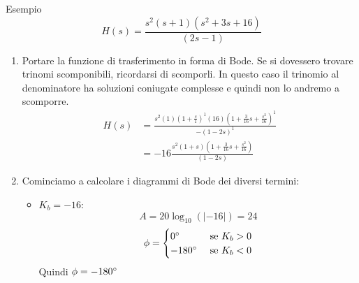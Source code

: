 \documentclass[a4paper]{article}
\begin{document}
\begin{examplebox}{Esempio}
    \[H(s) = \frac{s^2(s+1)(s^2+3s+16)}{(2s-1)}\]
    \begin{enumerate}
        \item Portare la funzione di trasferimento in forma di Bode. Se si dovessero trovare trinomi scomponibili, ricordarsi di scomporli. In questo caso
        il trinomio al denominatore ha soluzioni coniugate complesse e quindi non lo andremo a scomporre.
        \begin{align*}
            H(s) &= \frac{s^2(1)\left(1+\frac{s}{1}\right)^1(16)\left(1 + \frac{3}{16}s + \frac{s^2}{16}\right)^1}{-(1 - 2s)^1}\\
            &= -16 \frac{s^2(1+s)\left(1 +\frac{3}{16}s + \frac{s^2}{16}\right)}{(1-2s)}
        \end{align*}
        \item Cominciamo a calcolare i diagrammi di Bode dei diversi termini:
        \begin{itemize}
            \item $K_b = -16$: 
            \[A = 20\log_{10} (|-16|) = 24\]
            \[\phi = \begin{cases}
                0\degree & \text{ se } K_b > 0\\
                -180\degree & \text{ se } K_b < 0
            \end{cases}\]
            Quindi $\phi = -180\degree$
            \begin{figure}[H]
                \centering
            \end{figure}
            \begin{figure}[H]

\end{figure}
\end{itemize}
\end{enumerate}
\end{examplebox}
\end{document}
